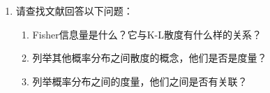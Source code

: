\begin{enumerate}[wide, labelindent=0pt]
\begin{enumerate}
        \item （扩散模型，\cite{hoDenoisingDiffusionProbabilistic2020}）我们假设数据$x=x_{0}$是由$z=(x_{1},\dots,x_{T})$生成的. 生成方式为逐渐对$x_{t}$去噪（逆向过程），去噪的过程是Markov链，起点为$x_{T}$，服从$p(x_{T}) = \mathcal{N}(x_{T};0,I)$：
        \begin{align*}
            p_{\theta}(x_{0:T}) &= p_{\theta}(x_{T})\prod_{t=1}^{T}p_{\theta}(x_{t-1}|x_{t}),\\
            p_{\theta}(x_{t-1}|x_{t}) &= \mathcal{ N}(x_{t-1}; \mu_{\theta}(x_{t}, t), \Sigma_{\theta}(x_{t}, t)).
        \end{align*}
        区别于VAE，这里的后验概率$q(x_{1:T}|x_{0})$通过加噪（前向）过程来得到，即
        \begin{align*}
            q(x_{1:T}|x_{0}) &= \prod_{t=1}^{T}q(x_{t}|x_{t-1}),\\
            q(x_{t}|x_{t-1}) &= \mathcal{N}(x_{t}; \sqrt{1-\beta_{t}}x_{t-1}, \beta_{t}I).
        \end{align*}
        扩散模型的思想就是学习后验概率中每一步加入的噪声，从而根据逆向过程生成数据.
        借助上一问的结论，证明损失函数可以写成：
        \begin{align*}
            \mathcal{L} =&\underbrace{\E_{x_0\sim q(x_0)}[D_{\KL}\left(q\left(x_T | x_0\right) \| p\left(x_T\right)\right)]}_{L_T}+\\
            &\qquad\sum_{t>1} \underbrace{\E_{x_0,x_t\sim q(x_0,x_t)}[D_{\KL}\left(q\left(x_{t-1} | x_t, x_0\right) \| p_\theta\left(x_{t-1} | x_t\right)\right)]}_{L_{t-1}}+\\
            &\qquad\underbrace{\E_{x_0,x_1\sim q(x_0,x_1)}[-\log p_\theta\left(x_0 | x_1\right)]}_{L_0},        
        \end{align*}
        其中$q(x_{t-1}|x_{t},x_{0})$是前向过程的后验.
    \end{enumerate}

    \item 请查找文献回答以下问题：
    \begin{enumerate}
        \item Fisher信息量是什么？它与K-L散度有什么样的关系？
        \item 列举其他概率分布之间散度的概念，他们是否是度量？
        \item 列举概率分布之间的度量，他们之间是否有关联？
    \end{enumerate}
    
\end{enumerate}